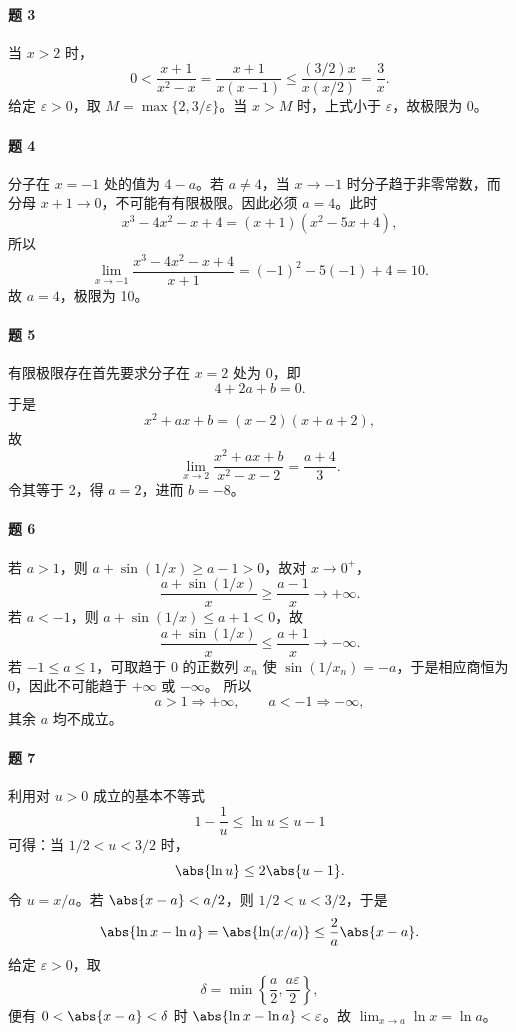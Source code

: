 \paragraph{题 3}
\begin{xsolution}
当 $x>2$ 时，
\[
  0<\frac{x+1}{x^2-x}
  =\frac{x+1}{x(x-1)}
  \leq\frac{(3/2)x}{x(x/2)}=\frac3x.
\]
给定 $\varepsilon>0$，取 $M=\max\{2,3/\varepsilon\}$。当 $x>M$ 时，上式小于 $\varepsilon$，故极限为 0。
\end{xsolution}

\paragraph{题 4}
\begin{xsolution}
分子在 $x=-1$ 处的值为 $4-a$。若 $a\ne4$，当 $x\to-1$ 时分子趋于非零常数，而分母 $x+1\to0$，不可能有有限极限。因此必须 $a=4$。此时
\[
  x^3-4x^2-x+4=(x+1)(x^2-5x+4),
\]
所以
\[
  \lim_{x\to-1}\frac{x^3-4x^2-x+4}{x+1}
  =(-1)^2-5(-1)+4=10.
\]
故 $a=4$，极限为 10。
\end{xsolution}

\paragraph{题 5}
\begin{xsolution}
有限极限存在首先要求分子在 $x=2$ 处为 0，即
\[
  4+2a+b=0.
\]
于是
\[
  x^2+ax+b=(x-2)(x+a+2),
\]
故
\[
  \lim_{x\to2}\frac{x^2+ax+b}{x^2-x-2}
  =\frac{a+4}{3}.
\]
令其等于 2，得 $a=2$，进而 $b=-8$。
\end{xsolution}

\paragraph{题 6}
\begin{xsolution}
若 $a>1$，则 $a+\sin(1/x)\geq a-1>0$，故对 $x\to0^+$，
\[
  \frac{a+\sin(1/x)}x\geq\frac{a-1}{x}\to+\infty.
\]
若 $a<-1$，则 $a+\sin(1/x)\leq a+1<0$，故
\[
  \frac{a+\sin(1/x)}x\leq\frac{a+1}{x}\to-\infty.
\]
若 $-1\leq a\leq1$，可取趋于 0 的正数列 $x_n$ 使
$\sin(1/x_n)=-a$，于是相应商恒为 0，因此不可能趋于 $+\infty$ 或 $-\infty$。
所以
\[
  a>1\Rightarrow+\infty,\qquad a<-1\Rightarrow-\infty,
\]
其余 $a$ 均不成立。
\end{xsolution}

\paragraph{题 7}
\begin{xsolution}
利用对 $u>0$ 成立的基本不等式
\[
  1-\frac1u\leq\ln u\leq u-1
\]
可得：当 $1/2<u<3/2$ 时，
\[
  \abs{\ln u}\leq2\abs{u-1}.
\]
令 $u=x/a$。若 $\abs{x-a}<a/2$，则 $1/2<u<3/2$，于是
\[
  \abs{\ln x-\ln a}
  =\abs{\ln(x/a)}
  \leq\frac2a\abs{x-a}.
\]
给定 $\varepsilon>0$，取
\[
  \delta=\min\left\{\frac a2,\frac{a\varepsilon}2\right\},
\]
便有 $0<\abs{x-a}<\delta$ 时 $\abs{\ln x-\ln a}<\varepsilon$。故
$\lim_{x\to a}\ln x=\ln a$。
\end{xsolution}

